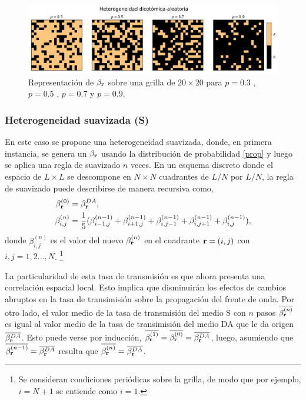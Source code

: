 \begin{figure}[t]
  \centering
  \includegraphics[width=1\textwidth]{heterogeneidad_dicot_aleatoria.pdf}
  \caption[Representación del medio DA sobre una grilla de $20 \times 20$.]{Representación de $\beta_{\vb r}$ sobre una grilla de $20 \times 20$ para  $p=0.3$ , $p=0.5$ , $p=0.7$ y $p=0.9$.}
  \label{fig:heterogeneidad_dicotómica_aleatoria}
\end{figure}

\subsubsection*{Heterogeneidad suavizada (S)}

En este caso se propone una heterogeneidad suavizada, donde, en primera instancia, se genera un $\beta_{\vb r}$ usando la distribución
de probabilidad \ref{prop} y luego se aplica una regla de suavizado $n$ veces. En un esquema discreto donde el espacio de $L\times L$ se descompone en
$N\times N$ cuadrantes de $L/N$ por $L/N$, la regla de suavizado puede describirse de manera recursiva como,
\begin{align}
  \beta^{(0)}_{\vb r} &= \beta_{\vb r}^{DA},\\ 
  \beta^{(n)}_{i,j} &= \frac{1}{5} (\beta^{(n-1)}_{i-1,j} + \beta^{(n-1)}_{i+1,j} + \beta^{(n-1)}_{i,j-1} + \beta^{(n-1)}_{i,j+1} + \beta^{(n-1)}_{i,j}),\label{suavizado}
\end{align}
donde $\beta^{(n)}_{i,j}$ es el valor del nuevo $\beta^{(n)}_{\vb r}$ en el cuadrante $\vb r =(i,j)$ con $i,j = 1,2...,N$.
\footnote{Se consideran condiciones periódicas sobre la grilla, de modo que por ejemplo, $i=N+1$ se entiende como $i=1$.} 

La particularidad de esta
tasa de transmisión es que ahora presenta una correlación espacial local. Esto implica que disminuirán los efectos de cambios abruptos en la tasa de 
transimisión sobre la propagación del frente de onda. Por otro lado, el valor medio de la tasa de transmisión del medio S con $n$ pasos $\overline{\beta^{(n)}_{\vb r}}$ es igual al valor medio de la tasa de transimisión del medio DA que le da origen $\overline{\beta_{\vb r}^{DA}}$. Esto puede verse por inducción, $\overline{\beta^{(1)}_{\vb r}}=\overline{\beta^{(0)}_{\vb r}}=\overline{\beta_{\vb r}^{DA}}$,
luego, asumiendo que $\overline{\beta^{(n-1)}_{\vb r}}=\overline{\beta_{\vb r}^{DA}}$ resulta que $\overline{\beta^{(n)}_{\vb r}}=\overline{\beta_{\vb r}^{DA}}$.

